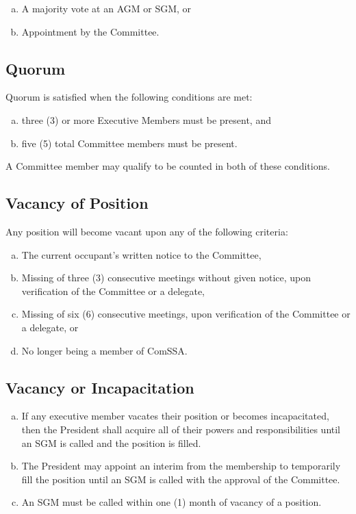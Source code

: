 \documentclass[a4paper,12pt]{article}
\begin{document}
\begin{enumerate}[a)]
	\item A majority vote at an AGM or SGM, or
	\item Appointment by the Committee.
\end{enumerate}

\subsection{Quorum}

Quorum is satisfied when the following conditions are met:

\begin{enumerate}[a)]
    \item three (3) or more Executive Members must be present, and
    \item five (5) total Committee members must be present.
\end{enumerate}

A Committee member may qualify to be counted in both of these conditions.

\subsection{Vacancy of Position}

Any position will become vacant upon any of the following criteria:

\begin{enumerate}[a)]
	\item The current occupant's written notice to the Committee,
	\item Missing of three (3) consecutive meetings without given notice, upon verification of the Committee or a delegate,
	\item Missing of six (6) consecutive meetings, upon verification of the Committee or a delegate, or
	\item No longer being a member of ComSSA.
\end{enumerate}

\subsection{Vacancy or Incapacitation}

\begin{enumerate}[a)]
	\item If any executive member vacates their position or becomes incapacitated, then the President shall acquire all of their powers and responsibilities until an SGM is called and the position is filled.
	\item The President may appoint an interim from the membership to temporarily fill the position until an SGM is called with the approval of the Committee.
	\item An SGM must be called within one (1) month of vacancy of a position.
\end{enumerate}
\end{document}

